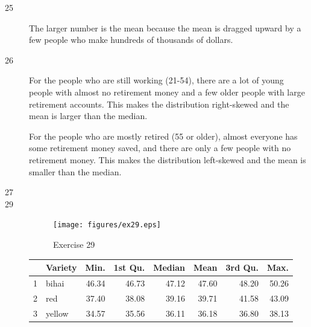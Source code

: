 \documentclass[letterpaper, landscape]{exam}
\begin{document}
  \ifprintanswers
    \begin{description}
      \item[25] The larger number is the mean because the mean is dragged upward by a few
        people who make hundreds of thousands of dollars.

      \item[26] 
        For the people who are still working (21-54), there are a lot of young people with
        almost no retirement money and a few older people with large retirement accounts.
        This makes the distribution right-skewed and the mean is larger than the median.

        For the people who are mostly retired (55 or older), almost everyone has some
        retirement money saved, and there are only a few people with no retirement money.
        This makes the distribution left-skewed and the mean is smaller than the median.

      \item[27] 

      \item[29]
        \begin{figure}[H]
          \centering
          \texttt{[image: figures/ex29.eps]}
          \caption{Exercise 29}
        \end{figure}

        \begin{table}[H]
          \centering
          \begin{tabular}{rlrrrrrr}
            \toprule
              & Variety & Min.  & 1st Qu. & Median & Mean  & 3rd Qu. & Max. \\
            \midrule
            1 & bihai   & 46.34 & 46.73   & 47.12  & 47.60 & 48.20   & 50.26 \\
            2 & red     & 37.40 & 38.08   & 39.16  & 39.71 & 41.58   & 43.09 \\
            3 & yellow  & 34.57 & 35.56   & 36.11  & 36.18 & 36.80   & 38.13 \\
            \bottomrule
          \end{tabular}
        \end{table}


\end{description}
\end{document}
